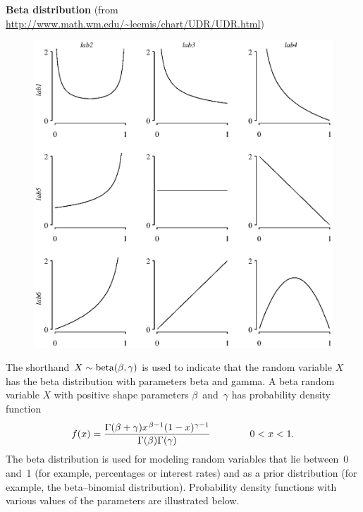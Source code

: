 \documentclass[12pt,fullpage]{article}
\begin{document}
\noindent
{\bf Beta distribution} (from \color{blue}\url{http://www.math.wm.edu/~leemis/chart/UDR/UDR.html}\color{black})

{\begin{figure}[b!]
\begin{center}
\includegraphics[width=6.0in]{BetaPlot.ps}
\end{center}
\end{figure}}

\noindent
The shorthand $X \sim {\rm beta}(\beta, \gamma)$ is used to indicate that the
random variable $X$ has the beta distribution with parameters beta and gamma.
A beta random variable $X$ with positive shape parameters $\beta$~and~$\gamma$ has probability density function 
$$
f(x) =\frac{\Gamma(\beta + \gamma) x ^ {\kern 0.08 em \beta - 1} (1 - x) ^ {\gamma - 1}}{\Gamma(\beta)\Gamma(\gamma)} \qquad \qquad 0<x<1.
$$
The beta distribution is used for modeling random variables that lie between~0 and~1 (for example,
percentages or interest rates) and as a prior distribution (for example, the beta--binomial
distribution).
Probability density functions with various values of the parameters are illustrated below.
\end{document}
